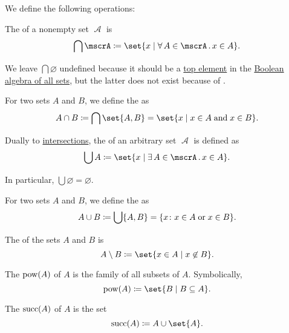 \begin{definition}\label{def:basic_set_operations}
  We define the following operations:

  \begin{thmenum}
     The  of a nonempty set \( \mscrA \) is
    \begin{equation*}
      \bigcap \mscrA \coloneqq \set{ x \given \qforall {A \in \mscrA} x \in A }.
    \end{equation*}

    We leave \( \bigcap \varnothing \) undefined because it should be a \hyperref[def:poset_extremal_points/top_and_bottom]{top element} in the \hyperref[thm:boolean_algebra_of_subsets]{Boolean algebra of all sets}, but the latter does not exist because of .

    For two sets \( A \) and \( B \), we define the  as
    \begin{equation*}
      A \cap B \coloneqq \bigcap \set{ A, B } = \set{ x \given x \in A \T{and} x \in B }.
    \end{equation*}

     Dually to \hyperref[def:basic_set_operations/intersection]{intersections}, the  of an arbitrary set \( \mscrA \) is defined as
    \begin{equation*}
      \bigcup A \coloneqq \set{ x \given \qexists {A \in \mscrA} x \in A }.
    \end{equation*}

    In particular, \( \bigcup \varnothing = \varnothing \).

    For two sets \( A \) and \( B \), we define the  as
    \begin{equation*}
      A \cup B \coloneqq \bigcup \{ A, B \} = \{ x \colon x \in A \T{or} x \in B \}.
    \end{equation*}

     The  of the sets \( A \) and \( B \) is
    \begin{equation*}
      A \setminus B \coloneqq \set{ x \in A \given x \not\in B }.
    \end{equation*}

     The  \( \operatorname{pow}(A) \) of \( A \) is the family of all subsets of \( A \). Symbolically,
    \begin{equation*}
      \pow(A) \coloneqq \set{ B \given B \subseteq A }.
    \end{equation*}

     The  \( \operatorname{succ}(A) \) of \( A \) is the set
    \begin{equation*}
      \op{succ}(A) \coloneqq A \cup \set{ A }.
    \end{equation*}
  \end{thmenum}
\end{definition}

